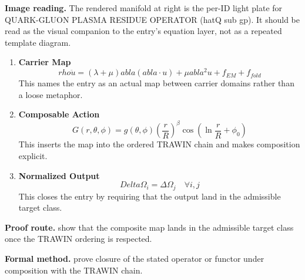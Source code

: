 \begin{samepage}
\noindent\begin{minipage}[t]{0.45\linewidth}
\vspace{0pt}
\raggedright
\scriptsize\textbf{Image reading.} The rendered manifold at right is the per-ID light plate for QUARK-GLUON PLASMA RESIDUE OPERATOR (hatQ sub gp). It should be read as the visual companion to the entry's equation layer, not as a repeated template diagram.\par
\end{minipage}\hfill
\begin{minipage}[t]{0.53\linewidth}
\vspace*{-0.10in}
\raggedright
{}
\end{minipage}
\end{samepage}

\clearpage


\begin{enumerate}[leftmargin=1.6em,itemsep=9pt,topsep=6pt]
\item \textbf{Carrier Map}
\[
rho \ddot{u} = (\lambda + \mu)  abla( abla \cdot u) + \mu  abla^2 u + f_{EM} + f_{fold}
\]
This names the entry as an actual map between carrier domains rather than a loose metaphor.

\item \textbf{Composable Action}
\[
G(r, \theta, \phi) = g(\theta, \phi) \left(\frac{r}{R}\right)^\beta \cos(\ln \frac{r}{R} + \phi_0)
\]
This inserts the map into the ordered TRAWIN chain and makes composition explicit.

\item \textbf{Normalized Output}
\[
Delta \Omega_i = \Delta \Omega_j \quad \forall i, j
\]
This closes the entry by requiring that the output land in the admissible target class.
\end{enumerate}

\textbf{Proof route.} show that the composite map lands in the admissible target class once the TRAWIN ordering is respected.

\textbf{Formal method.} prove closure of the stated operator or functor under composition with the TRAWIN chain.

\medskip
{}

